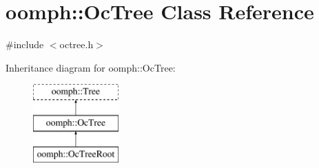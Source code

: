 \hypertarget{classoomph_1_1OcTree}{}\section{oomph\+:\+:Oc\+Tree Class Reference}
\label{classoomph_1_1OcTree}


{\ttfamily \#include $<$octree.\+h$>$}

Inheritance diagram for oomph\+:\+:Oc\+Tree\+:\begin{figure}[H]
\begin{center}
\leavevmode
\includegraphics[height=3.000000cm]{classoomph_1_1OcTree}
\end{center}
\end{figure}
